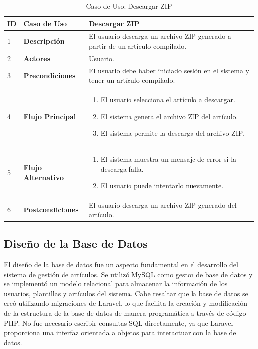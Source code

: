 \begin{table}[H]
    \centering
    \begin{tabular}{|p{0.5cm}|p{3.5cm}|p{10cm}|}
        \hline
        \textbf{ID} & \textbf{Caso de Uso} & \textbf{Descargar ZIP} \\
        \hline
        1 & \textbf{Descripción} & El usuario descarga un archivo ZIP generado a partir de un artículo compilado. \\
        \hline
        2 & \textbf{Actores} & Usuario. \\
        \hline
        3 & \textbf{Precondiciones} & El usuario debe haber iniciado sesión en el sistema y tener un artículo compilado. \\
        \hline
        4 & \textbf{Flujo Principal} & 
        \begin{enumerate}
            \item El usuario selecciona el artículo a descargar.
            \item El sistema genera el archivo ZIP del artículo.
            \item El sistema permite la descarga del archivo ZIP.
        \end{enumerate} \\
        \hline
        5 & \textbf{Flujo Alternativo} & 
        \begin{enumerate}
            \item El sistema muestra un mensaje de error si la descarga falla.
            \item El usuario puede intentarlo nuevamente.
        \end{enumerate} \\
        \hline
        6 & \textbf{Postcondiciones} & El usuario descarga un archivo ZIP generado del artículo. \\
        \hline
    \end{tabular}
    \caption{Caso de Uso: Descargar ZIP}
\label{tab:caso-uso-descargar-zip}

\end{table}

\subsection{Diseño de la Base de Datos}
El diseño de la base de datos fue un aspecto fundamental en el desarrollo del sistema de gestión de artículos. Se utilizó MySQL como gestor de base de datos y se implementó un modelo relacional para almacenar la información de los usuarios, plantillas y artículos del sistema. Cabe resaltar que la base de datos se creó utilizando migraciones de Laravel, lo que facilita la creación y modificación de la estructura de la base de datos de manera programática a través de código PHP. No fue necesario escribir consultas SQL directamente, ya que Laravel proporciona una interfaz orientada a objetos para interactuar con la base de datos.

